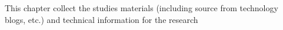This chapter collect the studies materials (including source from technology blogs, etc.) and technical information for the research 